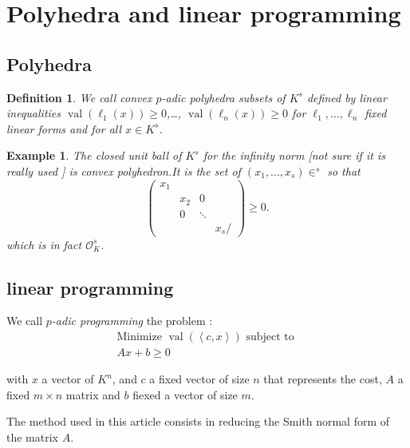 \documentclass[a4paper,12pt]{article}
\newtheorem{definition}{Definition}
\newtheorem{example}{Example}
\DeclareMathOperator{\val}{val}
\newcommand{\OK}{\mathcal{O}_K}
\begin{document}
\section{Polyhedra and linear programming}
\subsection{Polyhedra}

\begin{definition}
	We call {\it convex $p$-adic polyhedra} subsets of $K^s$ defined by linear inequalities $\val\left( \ell_1(x)\right)\ge 0$,\ldots, $ \val\left( \ell_n\left( x \right) \right)\ge 0$ for $ \ell_1,\ldots, \ell_n $ fixed linear forms and for all $x \in K ^s$.
	
	
\end{definition}

\begin{example}
	The closed unit ball of $K^s$ for the infinity norm [not sure if it is really used ] is convex polyhedron.It is the set of $\left( x_1,\ldots,x_s \right) \in  ^s$ so that $$
	\begin{pmatrix} x_1 &  & & \\
		& x_2 &0 &  \\
		&  0& \ddots & \\
		&  & & x_s/
	\end{pmatrix} \ge 0.$$ which is in fact $\OK^s$. 
	
\end{example}

\subsection{linear programming}
	We call { \it $p$-adic programming} the problem :
\begin{equation}
	\tag{PLp}
	\begin{matrix}
		\text{Minimize } \val\left(\left<c,x \right>\right) \text{ subject to }\\
		Ax + b \ge 0
	\end{matrix}
	\label{eqn:Proglinp}
\end{equation}

with $x$ a vector of $K ^n$, and $c$ a fixed vector of size $n$ that represents the cost, $A$ a fixed $m \times n $ matrix and $b$ fiexed a vector of size $m$.

The method used in this article consists in reducing the Smith normal form of the matrix $A$.
\end{document}
